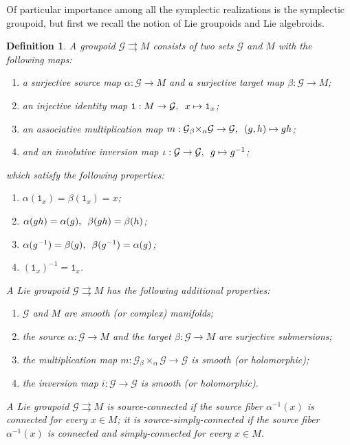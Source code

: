 \documentclass{amsart}
\newtheorem{definition}[theorem]{Definition}
\numberwithin{equation}{section}
\newcommand{\cG}{\mathcal{G}}
\begin{document}
Of particular importance among all the symplectic realizations is the symplectic groupoid, but first we recall the notion of Lie groupoids and Lie algebroids.
\begin{definition}
  A \emph{groupoid} $\cG\rightrightarrows M$ consists of two sets $\cG$ and $M$ with the following maps:
  \begin{enumerate}
    \item a surjective \emph{source map} $\alpha: \cG \to M$ and a surjective \emph{target map} $\beta: \cG \to M$;
    \item an injective identity map $\mathtt{1}: M \to \cG, \enskip x \mapsto \mathtt{1}_x$;
    \item an associative multiplication map $m: \cG {_\beta \times_\alpha} \cG \to \cG, \enskip (g, h) \mapsto gh$;
    \item and an involutive inversion map $\iota: \cG \to \cG, \enskip g \mapsto g^{-1}$;
  \end{enumerate}
  which satisfy the following properties:
  \begin{enumerate}
    \item $\alpha(\mathtt{1}_x) = \beta(\mathtt{1}_x) = x$;
    \item $\alpha(gh) = \alpha(g), \enskip \beta(gh) = \beta(h)$;
    \item $\alpha(g^{-1}) = \beta(g), \enskip \beta(g^{-1}) = \alpha(g)$;
    \item $(\mathtt{1}_x)^{-1} = \mathtt{1}_x$.
  \end{enumerate}
  A \emph{Lie groupoid} $\cG \rightrightarrows M$ has the following additional properties:
  \begin{enumerate}
    \item $\cG$ and $M$ are smooth (or complex) manifolds;
    \item the source $\alpha: \cG \to M$ and the target $\beta: \cG \to M$ are surjective submersions;
    \item the multiplication map $m: \cG {_\beta \times_\alpha} \cG \to \cG$ is smooth (or holomorphic);
    \item the inversion map $i: \cG \to \cG$ is smooth (or holomorphic).
  \end{enumerate}
  A Lie groupoid $\cG \rightrightarrows M$ is \emph{source-connected} if the source fiber $\alpha^{-1}(x)$ is connected for every $x \in M$; it is \emph{source-simply-connected} if the source fiber $\alpha^{-1}(x)$ is connected and simply-connected for every $x \in M$.
\end{definition}
\end{document}
